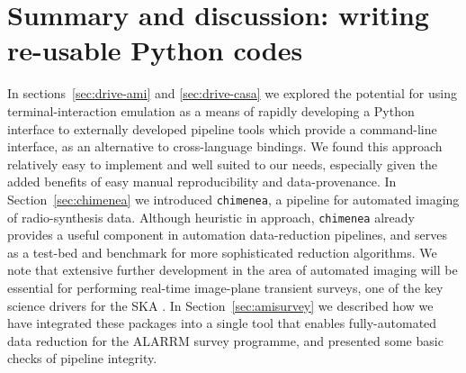 \documentclass[5p,authoryear]{elsarticle}
\begin{document}
\section{Summary and discussion: writing re-usable Python codes}
\label{sec:conclusion}
In sections~\ref{sec:drive-ami} and \ref{sec:drive-casa} we explored the potential for using terminal-interaction emulation as a means of rapidly developing a Python interface to externally developed pipeline tools which provide a command-line interface, as an alternative to cross-language bindings. 
We found this approach relatively easy to implement and well suited to our needs, especially given the added benefits of easy manual reproducibility and data-provenance. 
In Section~\ref{sec:chimenea} we introduced \texttt{chimenea}, a pipeline for automated imaging of radio-synthesis data. 
Although heuristic in approach, \texttt{chimenea} already provides a useful component in automation data-reduction pipelines, and serves as a test-bed and benchmark for more sophisticated reduction algorithms. 
We note that extensive further development in the area of automated imaging will be essential for performing real-time image-plane transient surveys, one of the key science drivers for the SKA \citep{Burlon2015,Corbel2015}.
In Section~\ref{sec:amisurvey} we described how we have integrated these packages into a single tool that enables fully-automated data reduction for the ALARRM survey programme, and presented some basic checks of pipeline integrity.
\end{document}
